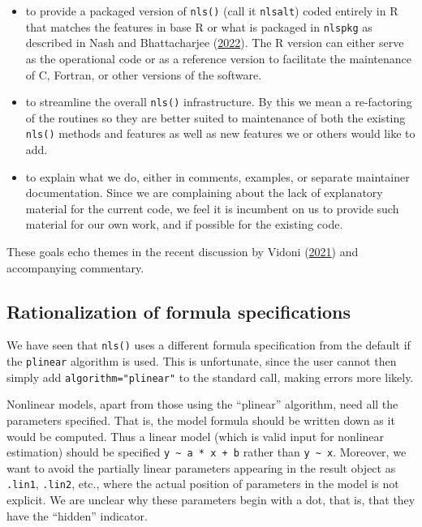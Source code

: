 \documentclass[
]{article}
\begin{document}
\begin{itemize}
\item
  to provide a packaged version of \texttt{nls()} (call it
  \texttt{nlsalt}) coded entirely in R that matches the features in base
  R or what is packaged in \texttt{nlspkg} as described in Nash and
  Bhattacharjee (\protect\hyperlink{ref-PkgFromRbase22}{2022}). The R
  version can either serve as the operational code or as a reference
  version to facilitate the maintenance of C, Fortran, or other versions
  of the software.
\item
  to streamline the overall \texttt{nls()} infrastructure. By this we
  mean a re-factoring of the routines so they are better suited to
  maintenance of both the existing \texttt{nls()} methods and features
  as well as new features we or others would like to add.
\item
  to explain what we do, either in comments, examples, or separate
  maintainer documentation. Since we are complaining about the lack of
  explanatory material for the current code, we feel it is incumbent on
  us to provide such material for our own work, and if possible for the
  existing code.
\end{itemize}

These goals echo themes in the recent discussion by Vidoni
(\protect\hyperlink{ref-Vidoni21}{2021}) and accompanying commentary.

\hypertarget{rationalization-of-formula-specifications}{%
\subsection{Rationalization of formula
specifications}\label{rationalization-of-formula-specifications}}

We have seen that \texttt{nls()} uses a different formula specification
from the default if the \texttt{plinear} algorithm is used. This is
unfortunate, since the user cannot then simply add
\texttt{algorithm="plinear"} to the standard call, making errors more
likely.

Nonlinear models, apart from those using the ``plinear'' algorithm, need
all the parameters specified. That is, the model formula should be
written down as it would be computed. Thus a linear model (which is
valid input for nonlinear estimation) should be specified
\texttt{y\ \textasciitilde{}\ a\ *\ x\ +\ b} rather than
\texttt{y\ \textasciitilde{}\ x}. Moreover, we want to avoid the
partially linear parameters appearing in the result object as
\texttt{.lin1}, \texttt{.lin2}, etc., where the actual position of
parameters in the model is not explicit. We are unclear why these
parameters begin with a dot, that is, that they have the ``hidden''
indicator.
\end{document}
